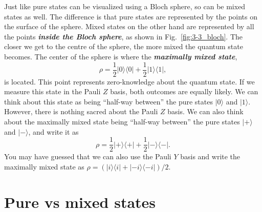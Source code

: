 Just like pure states can be visualized using a Bloch sphere, so can be mixed states as well.
The difference is that pure states are represented by the points on the surface of the sphere.
Mixed states on the other hand are represented by all the points \textit{\textbf{inside the Bloch sphere}}, as shown in Fig.~\ref{fig:3-3_bloch}.
The closer we get to the centre of the sphere, the more mixed the quantum state becomes.
The center of the sphere is where the \textit{\textbf{maximally mixed state}},
\begin{equation}
    \rho = \frac{1}{2} |0\rangle\langle0| + \frac{1}{2} |1\rangle\langle1|,
\end{equation}
is located.
This point represents zero-knowledge about the quantum state.
If we measure this state in the Pauli $Z$ basis, both outcomes are equally likely.
We can think about this state as being ``half-way between'' the pure states $|0\rangle$ and $|1\rangle$.
However, there is nothing sacred about the Pauli $Z$ basis.
We can also think about the maximally mixed state being ``half-way between'' the pure states $|+\rangle$ and $|-\rangle$, and write it as
\begin{equation}
    \rho = \frac{1}{2} |+\rangle\langle+| + \frac{1}{2} |-\rangle\langle-|.
\end{equation}
You may have guessed that we can also use the Pauli $Y$ basis and write the maximally mixed state as $\rho = ( |i\rangle\langle i| + |-i\rangle\langle-i| ) / 2$.






\section{Pure vs mixed states}
\label{sec:3-4_pure_vs_mixed}

